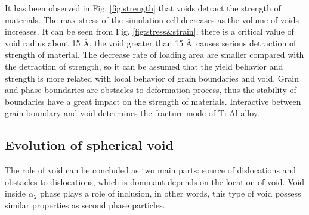 \documentclass[materials,article,submit,moreauthors,pdftex,10pt,a4paper]{Definitions/mdpi}
\begin{document}
	
It has been observed in Fig. \ref{fig:strength} that voids detract the strength of  materials. The max stress  of the simulation cell decreases as the volume of voids increases. It can be seen from Fig. \ref{fig:stress&strain}, there is a critical value of void radius about 15 \AA, the void greater than 15 \AA\ causes serious detraction of strength of material.  The decrease rate of loading area are smaller compared  with the detraction of strength, so it can be assumed that the  yield behavior and strength is more related with local behavior of grain boundaries and void. Grain and phase boundaries are obstacles to deformation process, thus the stability of boundaries have a great impact on the strength of materials. Interactive between grain boundary and void determines the fracture mode of   Ti-Al alloy.




\subsection{Evolution of spherical void}
The role of void can be concluded as two main parts: source of dislocations and obstacles to dislocations, which is dominant depends on the location of void. Void inside $\alpha_2$ phase plays a role of inclusion, in other words, this type of void possess similar properties as second phase particles.
 
\end{document}
